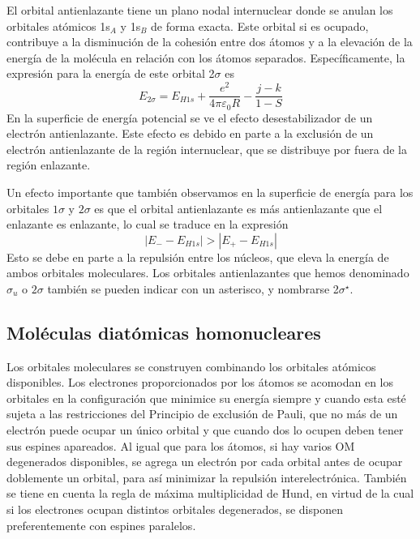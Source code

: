 \documentclass{tufte-handout}
\begin{document}
El orbital antienlazante tiene un plano nodal 
internuclear donde se anulan los orbitales atómicos
1s$_A$ y 1s$_B$ de forma exacta. Este orbital si 
es ocupado, contribuye a la disminución de la 
cohesión entre dos átomos y a la elevación de 
la energía de la molécula en relación con los 
átomos separados. Específicamente, la expresión para
la energía de este orbital 2$\sigma$ es
\begin{equation}
    E_{2\sigma}=E_{H1s} + \frac{e^2}{4\pi\varepsilon_0R}
    -\frac{j-k}{1-S}
\end{equation}
En la superficie de energía potencial se ve el efecto
desestabilizador de un electrón antienlazante. Este efecto
es debido en parte a la exclusión de un electrón 
antienlazante de la región internuclear, que se
distribuye por fuera de la región enlazante. 

Un efecto importante que también observamos en
la superficie de energía para los orbitales $1\sigma$
y $2\sigma$ es que el orbital antienlazante es más
antienlazante que el enlazante es enlazante, lo
cual se traduce en la expresión
\begin{equation}
    |E_{-}-E_{H1s}|>|E_+-E_{H1s}|
\end{equation}
Esto se debe en parte a la repulsión entre los 
núcleos, que eleva la energía de ambos orbitales 
moleculares. Los orbitales antienlazantes que hemos
denominado $\sigma_u$ o $2\sigma$ también se pueden indicar con 
un asterisco, y nombrarse 2$\sigma^\star$. 

\subsection{Moléculas diatómicas homonucleares}
 Los orbitales moleculares se construyen combinando los orbitales
 atómicos disponibles. Los electrones proporcionados por los
 átomos se acomodan en los orbitales en la configuración que
 minimice su energía siempre y cuando esta esté sujeta a las restricciones del Principio de exclusión de Pauli, que no más
 de un electrón puede ocupar un único orbital y que cuando dos 
 lo ocupen deben tener sus espines apareados.
 Al igual que para los átomos, si hay varios OM degenerados
 disponibles, se agrega un electrón por cada orbital antes de
 ocupar doblemente un orbital, para así minimizar la repulsión 
 interelectrónica. También se tiene en cuenta la regla de máxima
 multiplicidad de Hund, en virtud de la cual si los electrones 
 ocupan distintos orbitales degenerados, se disponen 
 preferentemente con espines paralelos.
\end{document}
